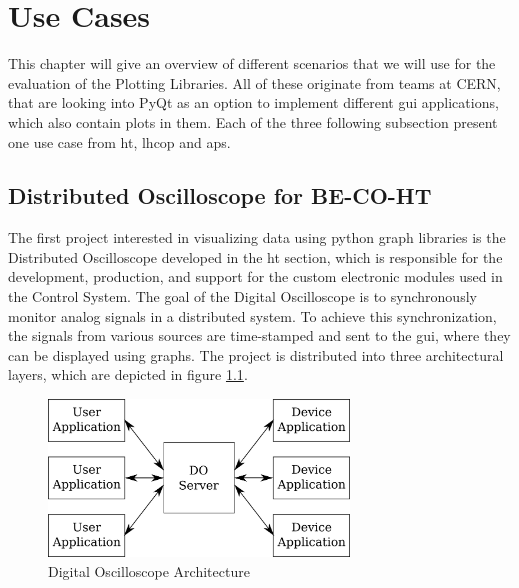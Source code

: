 
\chapter{Use Cases}
\label{ch:usecases}

This chapter will give an overview of different scenarios that we will use for
the evaluation of the Plotting Libraries. All of these originate from teams at
CERN, that are looking into PyQt as an option to implement different \gls{gui}
applications, which also contain plots in them. Each of the three following
subsection present one use case from \gls{ht}, \gls{lhcop} and \gls{aps}.


\section{Distributed Oscilloscope for BE-CO-HT}
\label{sec:usecases:becoht}

The first project interested in visualizing data using python graph libraries is
the Distributed Oscilloscope developed in the \gls{ht} section, which is
responsible for the development, production, and support for the custom
electronic modules used in the Control System. The goal of the Digital
Oscilloscope is to synchronously monitor analog signals in a distributed system.
To achieve this synchronization, the signals from various sources are
time-stamped and sent to the \gls{gui}, where they can be displayed using
graphs. The project is distributed into three architectural layers, which are
depicted in figure \ref{fig:doarchitecture}.

\begin{figure}[h]
    \centering
    \includegraphics[width=8cm]{resources/img/DoArchitecture}
    \caption{Digital Oscilloscope Architecture}
    \label{fig:doarchitecture}
\end{figure}

